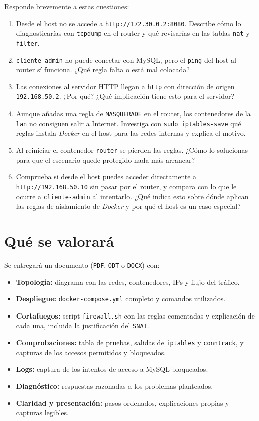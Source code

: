 \documentclass[a4paper]{article}
\begin{document}
Responde brevemente a estas cuestiones:

\begin{enumerate}
\item Desde el host no se accede a \texttt{http://172.30.0.2:8080}. Describe cómo lo diagnosticarías con \texttt{tcpdump} en el router y qué revisarías en las tablas \texttt{nat} y \texttt{filter}.
\item \texttt{cliente-admin} no puede conectar con MySQL, pero el \texttt{ping} del host al router sí funciona. ¿Qué regla falta o está mal colocada?
\item Las conexiones al servidor HTTP llegan a \texttt{http} con dirección de origen \texttt{192.168.50.2}. ¿Por qué? ¿Qué implicación tiene esto para el servidor?
\item Aunque añadas una regla de \texttt{MASQUERADE} en el router, los contenedores de la \texttt{lan} no consiguen salir a Internet. Investiga con \texttt{sudo iptables-save} qué reglas instala \emph{Docker} en el host para las redes internas y explica el motivo.
\item Al reiniciar el contenedor \texttt{router} se pierden las reglas. ¿Cómo lo solucionas para que el escenario quede protegido nada más arrancar?
\item Comprueba si desde el host puedes acceder directamente a \texttt{http://192.168.50.10} sin pasar por el router, y compara con lo que le ocurre a \texttt{cliente-admin} al intentarlo. ¿Qué indica esto sobre dónde aplican las reglas de aislamiento de \emph{Docker} y por qué el host es un caso especial?
\end{enumerate}
\section{Qué se valorará}
\label{sec:org9d0769a}

Se entregará un documento (\texttt{PDF}, \texttt{ODT} o \texttt{DOCX}) con:

\begin{itemize}
\item \textbf{Topología:} diagrama con las redes, contenedores, IPs y flujo del tráfico.
\item \textbf{Despliegue:} \texttt{docker-compose.yml} completo y comandos utilizados.
\item \textbf{Cortafuegos:} script \texttt{firewall.sh} con las reglas comentadas y explicación de cada una, incluida la justificación del \texttt{SNAT}.
\item \textbf{Comprobaciones:} tabla de pruebas, salidas de \texttt{iptables} y \texttt{conntrack}, y capturas de los accesos permitidos y bloqueados.
\item \textbf{Logs:} captura de los intentos de acceso a MySQL bloqueados.
\item \textbf{Diagnóstico:} respuestas razonadas a los problemas planteados.
\item \textbf{Claridad y presentación:} pasos ordenados, explicaciones propias y capturas legibles.
\end{itemize}
\end{document}
